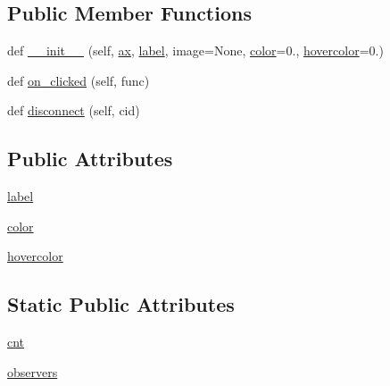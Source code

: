 \subsection*{Public Member Functions}
\begin{DoxyCompactItemize}
\item 
def \hyperlink{classmatplotlib_1_1widgets_1_1Button_afa231cff67815d2f86396e85bf96237e}{\+\_\+\+\_\+init\+\_\+\+\_\+} (self, \hyperlink{classmatplotlib_1_1widgets_1_1AxesWidget_ac0722858b7001d10a42055dc90420b4f}{ax}, \hyperlink{classmatplotlib_1_1widgets_1_1Button_a5292355f5489751ee84cfeb8bfd32965}{label}, image=None, \hyperlink{classmatplotlib_1_1widgets_1_1Button_a0db461b03c6f51c30a736425033790bb}{color}=\textquotesingle{}0.\textquotesingle{}, \hyperlink{classmatplotlib_1_1widgets_1_1Button_a9acc42a919c9077037a2664d6ab801d7}{hovercolor}=\textquotesingle{}0.\textquotesingle{})
\item 
def \hyperlink{classmatplotlib_1_1widgets_1_1Button_a061596d93476b79244626f8a79d52a81}{on\+\_\+clicked} (self, func)
\item 
def \hyperlink{classmatplotlib_1_1widgets_1_1Button_a65abc7ad50b24913e1da7f1a670dd4e8}{disconnect} (self, cid)
\end{DoxyCompactItemize}
\subsection*{Public Attributes}
\begin{DoxyCompactItemize}
\item 
\hyperlink{classmatplotlib_1_1widgets_1_1Button_a5292355f5489751ee84cfeb8bfd32965}{label}
\item 
\hyperlink{classmatplotlib_1_1widgets_1_1Button_a0db461b03c6f51c30a736425033790bb}{color}
\item 
\hyperlink{classmatplotlib_1_1widgets_1_1Button_a9acc42a919c9077037a2664d6ab801d7}{hovercolor}
\end{DoxyCompactItemize}
\subsection*{Static Public Attributes}
\begin{DoxyCompactItemize}
\item 
\hyperlink{classmatplotlib_1_1widgets_1_1Button_a817ac277afbd2540a3216cca3adfa3fd}{cnt}
\item 
\hyperlink{classmatplotlib_1_1widgets_1_1Button_a64b11292e43068344a3ab2ce4c3695a3}{observers}
\end{DoxyCompactItemize}

